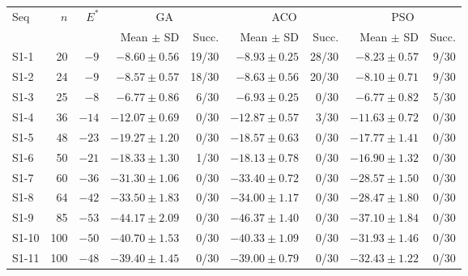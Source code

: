 \begin{tabular}{lrrrrrrrr}
\toprule
Seq & $n$ & $E^*$ & \multicolumn{2}{c}{GA} & \multicolumn{2}{c}{ACO} & \multicolumn{2}{c}{PSO} \\
\cmidrule(lr){4-5} \cmidrule(lr){6-7} \cmidrule(lr){8-9}
 & & & Mean $\pm$ SD & Succ. & Mean $\pm$ SD & Succ. & Mean $\pm$ SD & Succ. \\
\midrule
S1-1 & 20 & $-9$ & $-8.60 \pm 0.56$ & 19/30 & {\boldmath$-8.93 \pm 0.25$} & 28/30 & $-8.23 \pm 0.57$ & 9/30 \\
S1-2 & 24 & $-9$ & $-8.57 \pm 0.57$ & 18/30 & {\boldmath$-8.63 \pm 0.56$} & 20/30 & $-8.10 \pm 0.71$ & 9/30 \\
S1-3 & 25 & $-8$ & $-6.77 \pm 0.86$ & 6/30 & {\boldmath$-6.93 \pm 0.25$} & 0/30 & $-6.77 \pm 0.82$ & 5/30 \\
S1-4 & 36 & $-14$ & $-12.07 \pm 0.69$ & 0/30 & {\boldmath$-12.87 \pm 0.57$} & 3/30 & $-11.63 \pm 0.72$ & 0/30 \\
S1-5 & 48 & $-23$ & {\boldmath$-19.27 \pm 1.20$} & 0/30 & $-18.57 \pm 0.63$ & 0/30 & $-17.77 \pm 1.41$ & 0/30 \\
S1-6 & 50 & $-21$ & {\boldmath$-18.33 \pm 1.30$} & 1/30 & $-18.13 \pm 0.78$ & 0/30 & $-16.90 \pm 1.32$ & 0/30 \\
S1-7 & 60 & $-36$ & $-31.30 \pm 1.06$ & 0/30 & {\boldmath$-33.40 \pm 0.72$} & 0/30 & $-28.57 \pm 1.50$ & 0/30 \\
S1-8 & 64 & $-42$ & $-33.50 \pm 1.83$ & 0/30 & {\boldmath$-34.00 \pm 1.17$} & 0/30 & $-28.47 \pm 1.80$ & 0/30 \\
S1-9 & 85 & $-53$ & $-44.17 \pm 2.09$ & 0/30 & {\boldmath$-46.37 \pm 1.40$} & 0/30 & $-37.10 \pm 1.84$ & 0/30 \\
S1-10 & 100 & $-50$ & {\boldmath$-40.70 \pm 1.53$} & 0/30 & $-40.33 \pm 1.09$ & 0/30 & $-31.93 \pm 1.46$ & 0/30 \\
S1-11 & 100 & $-48$ & {\boldmath$-39.40 \pm 1.45$} & 0/30 & $-39.00 \pm 0.79$ & 0/30 & $-32.43 \pm 1.22$ & 0/30 \\
\bottomrule
\end{tabular}
